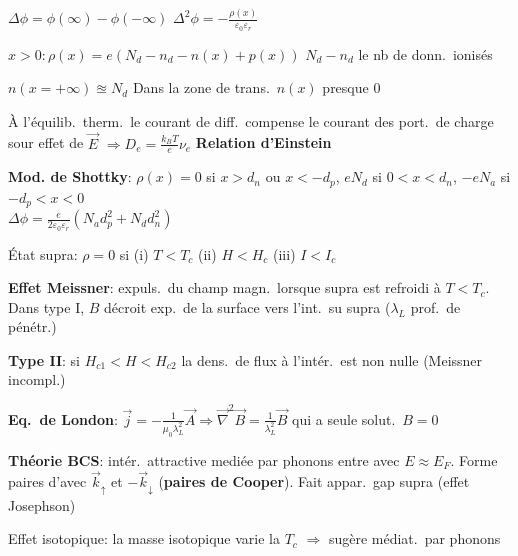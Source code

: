 \begin{squishlist}
    \item $\Delta \phi = \phi(\infty) - \phi(-\infty)$ \qquad $\Delta^2 \phi = - \frac{\rho(x)}{\varepsilon_0 \varepsilon_r}$
    \item $x>0 : \rho(x) = e (N_d - n_d - n(x) + p(x))$ \quad $N_d-n_d$ le nb de donn.\ ionisés
    \item $n(x=+\infty) \approxeq N_d$ \qquad Dans la zone de trans.\ $n(x)$ presque $0$
    \item À l'équilib.\ therm.\ le courant de diff.\ compense le courant des port.\ de charge sour effet de $\vec{E}$ $\Longrightarrow D_e = \frac{k_B T}{e} \nu_e$ \textbf{Relation d'Einstein}
    \item \textbf{Mod. de Shottky}: $\rho(x) = 0$ si $x>d_n$ ou $x < -d_p$, $eN_d$ si $0<x<d_n$, $-eN_a$ si $-d_p<x<0$ \\
    $\Delta \phi = \frac{e}{2 \varepsilon_0 \varepsilon_r} (N_a d_p^2 + N_d d_n^2)$
\end{squishlist}
\begin{squishlist}
    \item État supra: $\rho=0$ si (i) $T<T_c$ (ii) $H < H_c$ (iii) $I < I_c$
    \item \textbf{Effet Meissner}: expuls.\ du champ magn.\ lorsque supra est refroidi à $T<T_c$. \\
    Dans type I, $B$ décroit exp.\ de la surface vers l'int.\ su supra ($\lambda_L$ prof.\ de pénétr.)
    \item \textbf{Type II}: si $H_{c1}<H<H_{c2}$ la dens.\ de flux à l'intér.\ est non nulle (Meissner incompl.)
    \item \textbf{Eq.\ de London}: $\vec{j} = - \frac{1}{\mu_0 \lambda_L^2} \vec{A} \Longrightarrow \vec{\nabla}^2 \vec{B} = \frac{1}{\lambda_L^2}\vec{B}$ qui a seule solut.\ $B=0$
    \item \textbf{Théorie BCS}: intér.\ attractive mediée par phonons entre \elec avec $E\approx E_F$. Forme paires d'\elec avec $\vec{k}_{\uparrow}$ et $-\vec{k}_{\downarrow}$ (\textbf{paires de Cooper}). Fait appar.\ gap supra (effet Josephson)
    \item Effet isotopique: la masse isotopique varie la $T_c$ $\Rightarrow$ sugère médiat.\ par phonons
\end{squishlist}

